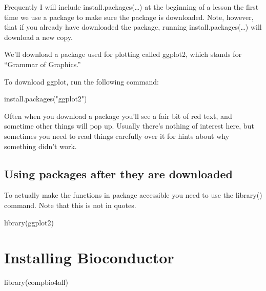 \documentclass[
]{book}
\newenvironment{Shaded}{\begin{snugshade}}{\end{snugshade}}
\newcommand{\FunctionTok}[1]{\textcolor[rgb]{0.00,0.00,0.00}{#1}}
\newcommand{\NormalTok}[1]{#1}
\newcommand{\StringTok}[1]{\textcolor[rgb]{0.31,0.60,0.02}{#1}}
\begin{document}
Frequently I will include install.packages(\ldots) at the beginning of a lesson the first time we use a package to make sure the package is downloaded. Note, however, that if you already have downloaded the package, running install.packages(\ldots) will download a new copy.

We'll download a package used for plotting called ggplot2, which stands for ``Grammar of Graphics.''

To download ggplot, run the following command:

\begin{Shaded}
\begin{Highlighting}[]
\FunctionTok{install.packages}\NormalTok{(}\StringTok{"ggplot2"}\NormalTok{)}
\end{Highlighting}
\end{Shaded}

Often when you download a package you'll see a fair bit of red text, and sometime other things will pop up. Usually there's nothing of interest here, but sometimes you need to read things carefully over it for hints about why something didn't work.

\hypertarget{using-packages-after-they-are-downloaded}{%
\section{Using packages after they are downloaded}\label{using-packages-after-they-are-downloaded}}

To actually make the functions in package accessible you need to use the library() command. Note that this is not in quotes.

\begin{Shaded}
\begin{Highlighting}[]
\FunctionTok{library}\NormalTok{(ggplot2)}
\end{Highlighting}
\end{Shaded}

\hypertarget{installing-bioconductor}{%
\chapter{Installing Bioconductor}\label{installing-bioconductor}}

\begin{Shaded}
\begin{Highlighting}[]
\FunctionTok{library}\NormalTok{(compbio4all)}
\end{Highlighting}
\end{Shaded}
\end{document}
